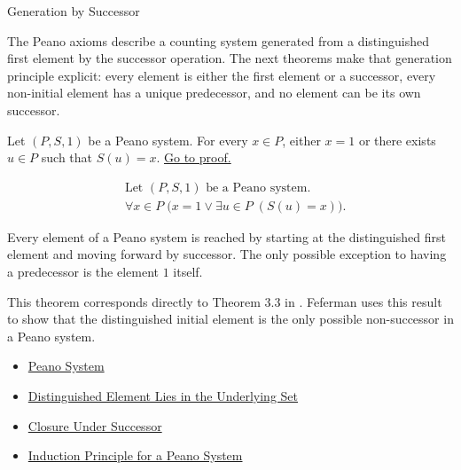 \begin{topicbox}{Generation by Successor}
\begin{exposition}
The Peano axioms describe a counting system generated from a distinguished
first element by the successor operation. The next theorems make that
generation principle explicit: every element is either the first element or a
successor, every non-initial element has a unique predecessor, and no element
can be its own successor.
\end{exposition}

\begin{tcolorbox}[colback=thmbox, colframe=thmborder, arc=2pt,
  left=6pt, right=6pt, top=4pt, bottom=4pt,
  title={\small\textbf{Theorem (Every Element Is Either \texorpdfstring{$1$}{1} or a Successor)}} ,
  fonttitle=\small\bfseries]
\begin{theorem}
\label{thm:every-element-is-one-or-a-successor}
Let $(P,S,1)$ be a Peano system. For every $x \in P$, either $x=1$ or there
exists $u \in P$ such that $S(u)=x$.
\hyperref[prf:every-element-is-one-or-a-successor]{Go to proof.}
\end{theorem}
\end{tcolorbox}

\begin{remark*}
\[
\begin{aligned}
&\text{Let } (P,S,1) \text{ be a Peano system.}\\
&\forall x \in P\;\bigl(x=1 \lor \exists u \in P\;(S(u)=x)\bigr).
\end{aligned}
\]
\end{remark*}

\begin{remark*}[Interpretation]
Every element of a Peano system is reached by starting at the distinguished
first element and moving forward by successor. The only possible exception to
having a predecessor is the element $1$ itself.
\end{remark*}

\begin{remark*}
This theorem corresponds directly to Theorem 3.3 in
\citet{FefermanNumberSystems1964}. Feferman uses this result to show that the
distinguished initial element is the only possible non-successor in a Peano
system.
\end{remark*}

\begin{remark*}[Dependencies]
\begin{itemize}
  \item \hyperref[def:peano-system]{Peano System}
  \item \hyperref[ax:peano-one-in-n]{Distinguished Element Lies in the Underlying Set}
  \item \hyperref[ax:peano-successor-closure]{Closure Under Successor}
  \item \hyperref[thm:induction-principle-for-peano-system]{Induction Principle for a Peano System}
\end{itemize}
\end{remark*}


\end{topicbox}
